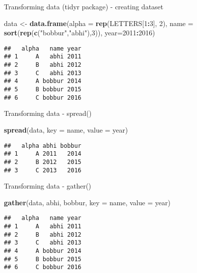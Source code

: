 \documentclass[ignorenonframetext,]{beamer}
\newenvironment{Shaded}{\begin{snugshade}}{\end{snugshade}}
\newcommand{\DataTypeTok}[1]{\textcolor[rgb]{0.13,0.29,0.53}{#1}}
\newcommand{\DecValTok}[1]{\textcolor[rgb]{0.00,0.00,0.81}{#1}}
\newcommand{\KeywordTok}[1]{\textcolor[rgb]{0.13,0.29,0.53}{\textbf{#1}}}
\newcommand{\NormalTok}[1]{#1}
\newcommand{\OperatorTok}[1]{\textcolor[rgb]{0.81,0.36,0.00}{\textbf{#1}}}
\newcommand{\StringTok}[1]{\textcolor[rgb]{0.31,0.60,0.02}{#1}}
\begin{document}
\begin{frame}[fragile]{Transforming data (tidyr package) - creating
dataset}
\protect\hypertarget{transforming-data-tidyr-package---creating-dataset}{}

\begin{Shaded}
\begin{Highlighting}[]
\NormalTok{data <-}\StringTok{ }\KeywordTok{data.frame}\NormalTok{(}\DataTypeTok{alpha =} \KeywordTok{rep}\NormalTok{(LETTERS[}\DecValTok{1}\OperatorTok{:}\DecValTok{3}\NormalTok{], }\DecValTok{2}\NormalTok{), }
\DataTypeTok{name =} \KeywordTok{sort}\NormalTok{(}\KeywordTok{rep}\NormalTok{(}\KeywordTok{c}\NormalTok{(}\StringTok{"bobbur"}\NormalTok{,}\StringTok{"abhi"}\NormalTok{),}\DecValTok{3}\NormalTok{)), }\DataTypeTok{year=}\DecValTok{2011}\OperatorTok{:}\DecValTok{2016}\NormalTok{)}
\end{Highlighting}
\end{Shaded}

\begin{verbatim}
##   alpha   name year
## 1     A   abhi 2011
## 2     B   abhi 2012
## 3     C   abhi 2013
## 4     A bobbur 2014
## 5     B bobbur 2015
## 6     C bobbur 2016
\end{verbatim}

\end{frame}

\begin{frame}[fragile]{Transforming data - spread()}
\protect\hypertarget{transforming-data---spread}{}

\begin{Shaded}
\begin{Highlighting}[]
\KeywordTok{spread}\NormalTok{(data, }\DataTypeTok{key =}\NormalTok{ name, }\DataTypeTok{value =}\NormalTok{ year) }
\end{Highlighting}
\end{Shaded}

\begin{verbatim}
##   alpha abhi bobbur
## 1     A 2011   2014
## 2     B 2012   2015
## 3     C 2013   2016
\end{verbatim}

\end{frame}

\begin{frame}[fragile]{Transforming data - gather()}
\protect\hypertarget{transforming-data---gather}{}

\begin{Shaded}
\begin{Highlighting}[]
\KeywordTok{gather}\NormalTok{(data, abhi, bobbur, }\DataTypeTok{key =}\NormalTok{ name, }\DataTypeTok{value =}\NormalTok{ year)}
\end{Highlighting}
\end{Shaded}

\begin{verbatim}
##   alpha   name year
## 1     A   abhi 2011
## 2     B   abhi 2012
## 3     C   abhi 2013
## 4     A bobbur 2014
## 5     B bobbur 2015
## 6     C bobbur 2016
\end{verbatim}

\end{frame}
\end{document}
